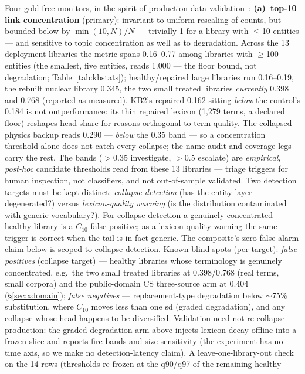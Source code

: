 \documentclass[sigconf,nonacm,anonymous]{acmart}
\begin{document}
Four gold-free monitors, in the spirit of production data
validation~\cite{tdd}: \textbf{(a)~top-10 link concentration}
(primary): invariant to uniform rescaling of counts, but bounded below
by $\min(10,N)/N$ --- trivially 1 for a library with $\leq$10
entities --- and sensitive to topic concentration as well as to
degradation. Across the 13 deployment libraries the metric spans
0.16--0.77 among libraries with $\geq$100 entities (the smallest, five
entities, reads 1.000 --- the floor bound, not degradation;
Table~\ref{tab:kbstats}); healthy/repaired large libraries run 0.16--0.19, the rebuilt nuclear
library 0.345, the two small treated libraries \emph{currently} 0.398
and 0.768 (reported as measured). KB2's repaired 0.162 sitting
\emph{below} the control's 0.184 is not outperformance: its thin
repaired lexicon (1{,}279 terms, a declared floor) reshapes head share
for reasons orthogonal to term quality. The collapsed physics backup reads
0.290 --- \emph{below} the 0.35 band --- so a concentration threshold
alone does not catch every collapse; the name-audit and coverage legs
carry the rest. The
bands ($>$0.35 investigate, $>$0.5 escalate) are \emph{empirical,
post-hoc} candidate thresholds read from these 13 libraries --- triage
triggers for human inspection, not classifiers, and not out-of-sample
validated. Two detection targets must be kept distinct: \emph{collapse
detection} (has the entity layer degenerated?) versus
\emph{lexicon-quality warning} (is the distribution contaminated with
generic vocabulary?). For collapse detection a genuinely concentrated
healthy library is a $C_{10}$ false positive; as a lexicon-quality
warning the same trigger is correct when the tail is in fact generic.
The composite's zero-false-alarm claim below is scoped to collapse
detection. Known blind spots (per target): \emph{false positives}
(collapse target) --- healthy libraries whose terminology is genuinely
concentrated, e.g.\ the two small treated libraries at 0.398/0.768
(real terms, small corpora) and the public-domain CS three-source arm
at 0.404 (\S\ref{sec:xdomain}); \emph{false negatives} ---
replacement-type degradation below ${\sim}$75\% substitution, where
$C_{10}$ moves less than one sd (graded degradation), and any collapse
whose head happens to be diversified. Validation need not re-collapse
production: the graded-degradation arm above injects lexicon decay
offline into a frozen slice and reports fire bands and size
sensitivity (the experiment has no time axis, so we make no
detection-latency claim). A leave-one-library-out check on the 14
rows (thresholds re-frozen at the q90/q97 of the remaining healthy
\end{document}
